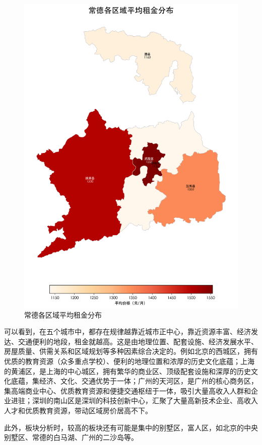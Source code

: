 \begin{figure}[htbp]
    \centering
    \includegraphics[width=0.7\linewidth]{../../figure/changde_region_heat_map.png}
    \caption{常德各区域平均租金分布}
    \label{fig:changde_region_heat_map}
\end{figure}

可以看到，在五个城市中，都存在规律越靠近城市正中心，靠近资源丰富、经济发达、交通便利的地段，租金就越高。这是由地理位置、配套设施、经济发展水平、房屋质量、供需关系和区域规划等多种因素综合决定的。例如北京的西城区，拥有优质的教育资源（众多重点学校）、便利的地理位置和浓厚的历史文化底蕴；上海的黄浦区，是上海的中心城区，拥有繁华的商业区、顶级配套设施和深厚的历史文化底蕴，集经济、文化、交通优势于一体；广州的天河区，是广州的核心商务区，集高端商业中心、优质教育资源和便捷交通枢纽于一体，吸引大量高收入人群和企业进驻；深圳的南山区是深圳的科技创新中心，汇聚了大量高新技术企业、高收入人才和优质教育资源，带动区域房价居高不下。

此外，板块分析时，较高的板块还有可能是集中的别墅区，富人区，如北京的中央别墅区、常德的白马湖、广州的二沙岛等。

